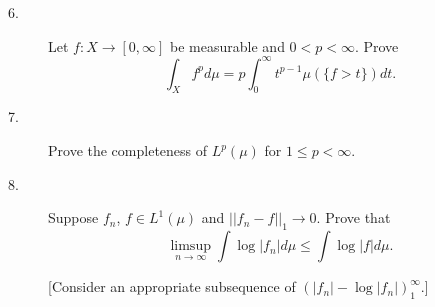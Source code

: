 \documentclass[bbb]{report}
\begin{document}
\begin{Large}
\begin{description}
\vspace{.2in}

\item[6.] Let $f:X\to[0,\infty]$ be measurable and
$0<p<\infty$. Prove
$$ \int_Xf^pd\mu=p\int^\infty_0t^{p-1}\mu(\{f>t\})dt.$$

\vspace{.2in}

\item[7.] Prove the completeness of $L^p(\mu)$ for $1\leq p<\infty$.

\vspace{.2in}

\item[8.] Suppose $f_n$, $f\in L^1(\mu)$ and $||f_n-f||_1\to 0$. Prove
that
$$ \limsup_{n\to\infty}\int \log|f_n|d\mu\leq\int\log|f|d\mu.$$

\item[] [Consider an appropriate subsequence of
$(|f_n|-\log|f_n|)^\infty_1$.]




\end{description}

\end{Large}
\end{document}
